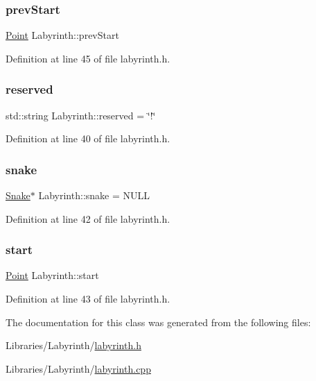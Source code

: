 \subsubsection{\texorpdfstring{prevStart}{prevStart}}
{\footnotesize\ttfamily \mbox{\hyperlink{common_8h_aa9cfdb80b4ca12013a2de8a3b9b97981}{Point}} Labyrinth\+::prev\+Start\hspace{0.3cm}{\ttfamily [private]}}



Definition at line 45 of file labyrinth.\+h.

\mbox{\label{class_labyrinth_aafa921122b2ea77268cbe479949d7d39}} 
\subsubsection{\texorpdfstring{reserved}{reserved}}
{\footnotesize\ttfamily std\+::string Labyrinth\+::reserved = \char`\"{}!\char`\"{}\hspace{0.3cm}{\ttfamily [private]}}



Definition at line 40 of file labyrinth.\+h.

\mbox{\label{class_labyrinth_a09a46368bfd83ccb75580687cb17b92f}} 
\subsubsection{\texorpdfstring{snake}{snake}}
{\footnotesize\ttfamily \mbox{\hyperlink{class_snake}{Snake}}$\ast$ Labyrinth\+::snake = N\+U\+LL\hspace{0.3cm}{\ttfamily [private]}}



Definition at line 42 of file labyrinth.\+h.

\mbox{\label{class_labyrinth_a92649fa3b24fcc869418b54e7362e24f}} 
\subsubsection{\texorpdfstring{start}{start}}
{\footnotesize\ttfamily \mbox{\hyperlink{common_8h_aa9cfdb80b4ca12013a2de8a3b9b97981}{Point}} Labyrinth\+::start\hspace{0.3cm}{\ttfamily [private]}}



Definition at line 43 of file labyrinth.\+h.



The documentation for this class was generated from the following files\+:\begin{DoxyCompactItemize}
\item 
Libraries/\+Labyrinth/\mbox{\hyperlink{labyrinth_8h}{labyrinth.\+h}}\item 
Libraries/\+Labyrinth/\mbox{\hyperlink{labyrinth_8cpp}{labyrinth.\+cpp}}\end{DoxyCompactItemize}
